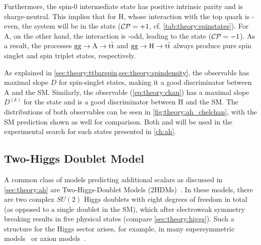 Furthermore, the spin-0 intermediate state has positive intrinsic parity and is charge-neutral. This implies that for H, whose interaction with the top quark is \CP-even, the \ttbar system will be in the  state ($\mathcal{CP} = +1$, cf. \cref{tab:theory:spinstates}). For A, on the other hand, the interaction is \CP-odd, leading to the  state ($\mathcal{CP} = -1$). As a result, the processes $\mathrm{gg \rightarrow A \rightarrow \mathrm{t \bar{t}}}$ and $\mathrm{gg \rightarrow H \rightarrow \mathrm{t \bar{t}}}$ always produce pure spin singlet and spin triplet states, respectively.


\enlargethispage{\baselineskip}

As explained in \cref{sec:theory:ttbarspin,sec:theory:spindensity}, the observable \chel has maximal slope $D$ for spin-singlet states, making it a good discriminator between A and the SM. 
Similarly, the observable \chan (\cref{eq:theory:chan}) has a maximal slope $D^{(k)}$ for the  state and is a good discriminator between H and the SM.
The distributions of both observables can be seen in \cref{fig:theory:ah_chelchan}, with the SM prediction shown as well for comparison. Both \chel and \chan will be used in the experimental search for such states presented in \cref{ch:ah}.

\subsection{Two-Higgs Doublet Model}
\label{sec:theory:twohdm}

A common class of models predicting additional scalars as discussed in \cref{sec:theory:ah} are Two-Higgs-Doublet Models (2HDMs)~\cite{Lee:1973iz,Branco:2011iw}. In these models, there are two complex $SU(2)$ Higgs doublets with eight degrees of freedom in total (as opposed to a single doublet in the SM), which after electroweak symmetry breaking results in five physical states (compare \cref{sec:theory:higgs}). Such a structure for the Higgs sector arises, for example, in many supersymmetric models~\cite{Haber:1984rc} or axion models~\cite{Kim:1986ax}.

